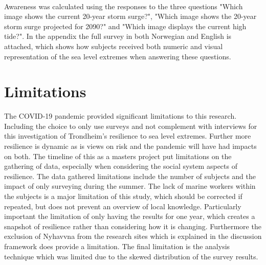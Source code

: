 \paragraph{}
Awareness was calculated using the responses to the three questions "Which image shows the current 20-year storm surge?", "Which image shows the 20-year storm surge projected for 2090?" and "Which image displays the current high tide?". In the appendix the full survey in both Norwegian and English is attached, which shows how subjects received both numeric and visual representation of the sea level extremes when answering these questions. 


\section{Limitations}
The COVID-19 pandemic provided significant limitations to this research. Including the choice to only use surveys and not complement with interviews for this investigation of Trondheim's resilience to sea level extremes. Further more resilience is dynamic as is views on risk and the pandemic will have had impacts on both. The timeline of this as a masters project put limitations on the gathering of data, especially when considering the social system aspects of resilience. The data gathered limitations include the number of subjects and the impact of only surveying during the summer. The lack of marine workers within the subjects is a major limitation of this study, which should be corrected if repeated, but does not prevent an overview of local knowledge. Particularly important the limitation of only having the results for one year, which creates a snapshot of resilience rather than considering how it is changing. Furthermore the exclusion of Nyhavvna from the research sites which is explained in the discussion framework does provide a limitation.  The final limitation is the analysis technique which was limited due to the skewed distribution of the survey results.

